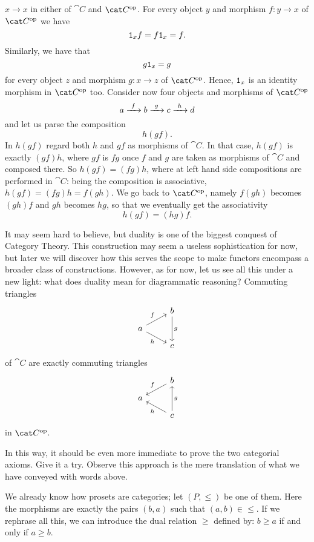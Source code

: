 \(x \to x\) in either of \(\cat C\) and \(\op{\cat C}\). For every
object \(y\) and morphism \(f : y \to x\) of \(\op{\cat C}\) we have
\[\mathtt 1_x f = f \mathtt 1_x = f .\]
Similarly, we have that
\[g \mathtt 1_x = g\] for every object \(z\) and morphism \(g : x \to z\) of
\(\op{\cat C}\). Hence, \(\mathtt 1_x\) is an identity morphism in
\(\op{\cat C}\) too. Consider now four objects and morphisms of
\(\op{\cat C}\)
\[a \xrightarrow{\ f\ } b \xrightarrow{\ g\ } c \xrightarrow{\ h\ } d\] and let us parse the
composition
\[h(gf) .\] In \(h(gf)\) regard both \(h\) and \(gf\) as morphisms of
\(\cat C\). In that case, \(h(gf)\) is exactly \((gf)h\), where \(gf\)
is \(fg\) once \(f\) and \(g\) are taken as morphisms of \(\cat C\)
and composed there. So \(h(gf) = (fg)h\), where at left hand side
compositions are performed in \(\cat C\): being the composition is
associative, \(h(gf) = (fg)h = f(gh)\). We go back to \(\op{\cat C}\),
namely \(f(gh)\) becomes \((gh)f\) and \(gh\) becomes \(hg\), so that
we eventually get the associativity
\[h(gf) = (hg) f .\]

It may seem hard to believe, but duality is one of the biggest
conquest of Category Theory.  This construction may seem a useless sophistication for
now, but later we will discover how this serves the scope to make
functors encompass a broader class of constructions. However, as for
now, let us see all this under a new light: what does duality mean for
diagrammatic reasoning? Commuting triangles
\[\begin{tikzcd}[row sep=small]
    & b \ar["g", dd] \\
    a \ar["f", ur] \ar["h", dr, swap] \\
    & c
  \end{tikzcd}\] of \(\cat C\) are exactly commuting triangles
\[\begin{tikzcd}[row sep=small]
    & b \ar["f", dl, swap] \\
    a \\
    & c \ar["h", ul] \ar["g", uu, swap]
  \end{tikzcd}\] in \(\opcat C\).

\begin{exercise}
  In this way, it should be even more immediate to prove the two
  categorial axioms. Give it a try. Observe this approach is the mere
  translation of what we have conveyed with words above.
\end{exercise}

\begin{example}
  We already know how prosets are categories; let \((P, \leqslant)\) be one of
  them. Here the morphisms are exactly the pairs \((b, a)\) such that
  \((a, b) \in \leqslant\). If we rephrase all this, we can introduce the dual
  relation \(\geqslant\) defined by: \(b \geqslant a\) if and only if \(a \geqslant b\).
\end{example}

